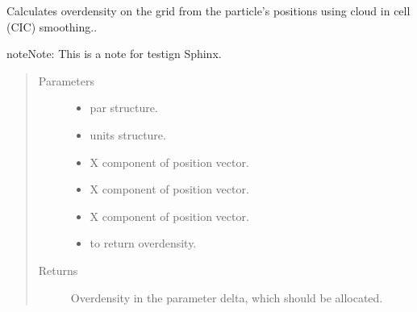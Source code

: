 \documentclass[letterpaper,10pt,english]{sphinxmanual}
\begin{document}
\begin{fulllineitems}
\label{\detokenize{sphinx-c-apidoc/output/pm/calc_delta_cic_c:c.calc_delta_cic}}%
\pysigstartmultiline
{}%
\pysigstopmultiline
Calculates overdensity on the grid from the particle’s positions
using cloud in cell (CIC) smoothing..

\begin{sphinxadmonition}{note}{Note:}
This is a note for testign Sphinx.
\end{sphinxadmonition}
\begin{quote}\begin{description}
\item[{Parameters}] \leavevmode\begin{itemize}
\item {} 
 \textendash{} par structure.

\item {} 
 \textendash{} units structure.

\item {} 
 \textendash{} X component of position vector.

\item {} 
 \textendash{} X component of position vector.

\item {} 
 \textendash{} X component of position vector.

\item {} 
 \textendash{} to return overdensity.

\end{itemize}

\item[{Returns}] \leavevmode
Overdensity in the parameter delta, which should be allocated.

\end{description}\end{quote}

\end{fulllineitems}
\end{document}

